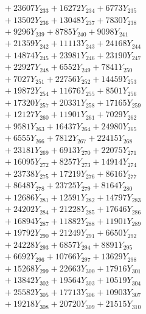 \documentclass[a4paper,10pt]{article}
\begin{document}
{\begin{align}
&\;  + 23607 Y_{233} + 16272 Y_{234} + 6773 Y_{235} \\[0.3ex]
&\;  + 13502 Y_{236} + 13048 Y_{237} + 7830 Y_{238} \\[0.5ex]\allowbreak
&\;  + 9296 Y_{239} + 8785 Y_{240} + 9098 Y_{241} \\[0.3ex]
&\;  + 21359 Y_{242} + 11113 Y_{243} + 24168 Y_{244} \\[0.3ex]
&\;  + 14874 Y_{245} + 23981 Y_{246} + 23190 Y_{247} \\[0.3ex]
&\;  + 22927 Y_{248} + 6552 Y_{249} + 7841 Y_{250} \\[0.3ex]
&\;  + 7027 Y_{251} + 22756 Y_{252} + 14459 Y_{253} \\[0.3ex]
&\;  + 19872 Y_{254} + 11676 Y_{255} + 8501 Y_{256} \\[0.3ex]
&\;  + 17320 Y_{257} + 20331 Y_{258} + 17165 Y_{259} \\[0.3ex]
&\;  + 12127 Y_{260} + 11901 Y_{261} + 7029 Y_{262} \\[0.3ex]
&\;  + 9581 Y_{263} + 16437 Y_{264} + 24980 Y_{265} \\[0.3ex]
&\;  + 6555 Y_{266} + 7812 Y_{267} + 22415 Y_{268} \\[0.5ex]\allowbreak
&\;  + 23181 Y_{269} + 6913 Y_{270} + 22075 Y_{271} \\[0.3ex]
&\;  + 16095 Y_{272} + 8257 Y_{273} + 14914 Y_{274} \\[0.3ex]
&\;  + 23738 Y_{275} + 17219 Y_{276} + 8616 Y_{277} \\[0.3ex]
&\;  + 8648 Y_{278} + 23725 Y_{279} + 8164 Y_{280} \\[0.3ex]
&\;  + 12686 Y_{281} + 12591 Y_{282} + 14797 Y_{283} \\[0.3ex]
&\;  + 24202 Y_{284} + 21228 Y_{285} + 17646 Y_{286} \\[0.3ex]
&\;  + 16894 Y_{287} + 11882 Y_{288} + 11901 Y_{289} \\[0.3ex]
&\;  + 19792 Y_{290} + 21249 Y_{291} + 6650 Y_{292} \\[0.3ex]
&\;  + 24228 Y_{293} + 6857 Y_{294} + 8891 Y_{295} \\[0.3ex]
&\;  + 6692 Y_{296} + 10766 Y_{297} + 13629 Y_{298} \\[0.5ex]\allowbreak
&\;  + 15268 Y_{299} + 22663 Y_{300} + 17916 Y_{301} \\[0.3ex]
&\;  + 13842 Y_{302} + 19564 Y_{303} + 10519 Y_{304} \\[0.3ex]
&\;  + 25582 Y_{305} + 17713 Y_{306} + 10903 Y_{307} \\[0.3ex]
&\;  + 19218 Y_{308} + 20720 Y_{309} + 21515 Y_{310} \\[0.3ex]

\end{align}}
\end{document}
